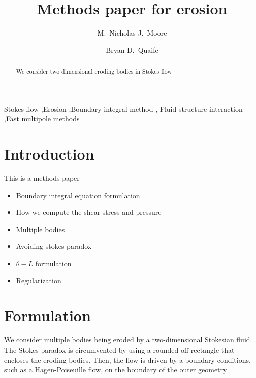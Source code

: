 \documentclass[preprint, 10pt]{elsarticle}
\begin{document}
\title{Methods paper for erosion}

\author[Nick]{M.~Nicholas J.~Moore}
\author[Bryan]{Bryan D.~Quaife}
\address[Nick]{Department of Mathematics and Geophysical Fluid Dynamics Institute, Florida State University, Tallahassee, FL, 32306.}
\address[Bryan]{Department of Scientific Computing and Geophysical Fluid Dynamics Institute, Florida State University, Tallahassee, FL, 32306.}

\begin{abstract} 
We consider two dimensional eroding bodies in Stokes flow
\end{abstract}

\begin{keyword}
  Stokes flow \sep Erosion \sep Boundary integral method \sep
  Fluid-structure interaction \sep Fast multipole methods 
\end{keyword}

\maketitle

\section{Introduction\label{s:intro}}

This is a methods paper
\begin{itemize}
  \item Boundary integral equation formulation
  \item How we compute the shear stress and pressure
  \item Multiple bodies
  \item Avoiding stokes paradox
  \item $\theta-L$ formulation
  \item Regularization
\end{itemize}

\cite{moo-ris-chi-zha-she2013}



\section{Formulation\label{s:formulation}} 
We consider multiple bodies being eroded by a two-dimensional Stokesian
fluid.  The Stokes paradox is circumvented by using a rounded-off
rectangle that encloses the eroding bodies.  Then, the flow is driven
by a boundary conditions, such as a Hagen-Poiseuille flow, on the
boundary of the outer geometry 
\end{document}
